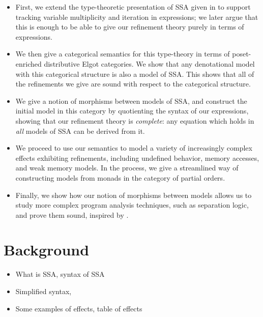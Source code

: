 \documentclass[acmsmall,screen,review]{acmart}
\begin{document}
\begin{itemize}
  \item First, we extend the type-theoretic presentation of SSA given in
  \citet{ghalayini-24-ssa-densem-arxiv} to support tracking variable multiplicity and iteration
  in expressions; we later argue that this is enough to be able to give our refinement theory
  purely in terms of expressions.
  \item We then give a categorical semantics for this type-theory in terms of poset-enriched
  distributive Elgot categories. We show that any denotational model with this categorical structure
  is also a model of SSA. This shows that all of the refinements we give are sound with respect to
  the categorical structure.
  \item We give a notion of morphisms between models of SSA, and construct the initial model in this
  category by quotienting the syntax of our expressions, showing that our refinement theory is
  \emph{complete}: any equation which holds in \emph{all} models of SSA can be derived from it.
  \item We proceed to use our semantics to model a variety of increasingly complex effects
  exhibiting refinements, including undefined behavior, memory accesses, and weak memory models. In
  the process, we give a streamlined way of constructing models from monads in the category of
  partial orders.
  \item Finally, we show how our notion of morphisms between models allows us to study more complex
  program analysis techniques, such as separation logic, and prove them sound, inspired by
  \citet{mellies-ftrs}.
\end{itemize}

\section{Background}

\begin{itemize}
  \item What is SSA, syntax of SSA
  \item Simplified syntax, \citet{ghalayini-24-ssa-densem-arxiv}
  \item Some examples of effects, table of effects
\end{itemize}
\end{document}
